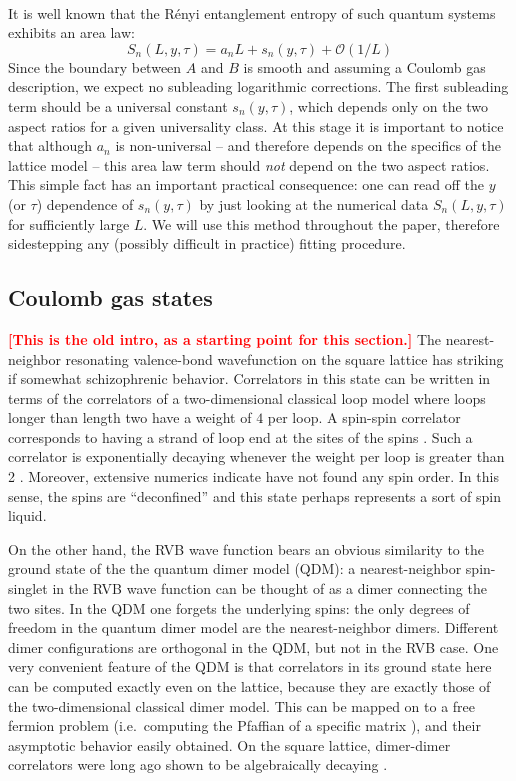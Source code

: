 \documentclass[11pt]{iopart}
\begin{document}
\paragraph{}
 It is well known that the R\'enyi entanglement entropy of such quantum systems exhibits an area law\cite{ALreview}:
 \begin{equation}
 S_n(L,y,\tau)= a_{n} L+s_{n}(y,\tau)+\mathcal{O}(1/L)
\end{equation}
Since the boundary between $A$ and $B$ is smooth and assuming a Coulomb gas description, we expect no subleading logarithmic corrections\cite{Hsu2009}. The first subleading term should be a universal constant $s_n(y,\tau)$, which depends only on the two aspect ratios for a given universality class. At this stage it is important to notice that although $a_n$ is non-universal -- and therefore depends on the specifics of the lattice model -- this area law term should \emph{not} depend on the two aspect ratios. This simple fact has an important practical consequence: one can read off the $y$ (or $\tau$) dependence of $s_n(y,\tau)$ by just looking at the numerical data $S_n(L,y,\tau)$ for sufficiently large $L$. We will use this method\cite{Ju2012} throughout the paper, therefore sidestepping any  (possibly difficult in practice) fitting procedure.    
\subsection{Coulomb gas states}
\label{sec:cg}
\textcolor{red}{\bf [This is the old intro, as a starting point for this section.]}
The nearest-neighbor resonating valence-bond wavefunction on the square lattice has striking if somewhat schizophrenic behavior. Correlators in this state can be written in terms of the correlators of a two-dimensional classical loop model where loops longer than length two have a weight of $4$ per loop. A spin-spin correlator corresponds to having a strand of loop end at the sites of the spins \cite{Doucot}. Such a correlator is exponentially decaying  whenever the weight per loop is greater than 2 \cite{Nienhuis}.  Moreover, extensive numerics indicate \cite{RVB1,RVB2} have not found any  spin order. In this sense, the spins are ``deconfined'' and this state perhaps represents a sort of spin liquid.

On the other hand, the RVB wave function bears an obvious similarity to the ground state of the
 the quantum dimer model (QDM)\cite{RokhsarKivelson}: a nearest-neighbor spin-singlet in the RVB wave function can be thought of as a dimer connecting the two sites. In the QDM one forgets the underlying spins: the only degrees of freedom in the quantum dimer model are the nearest-neighbor dimers. Different dimer configurations are orthogonal in the QDM, but  not in the RVB case. One very convenient feature of the QDM is that  correlators in its ground state here can be computed exactly even on the lattice, because they are exactly those of the two-dimensional classical dimer model. This can be mapped on to a free fermion problem (i.e.\ computing the Pfaffian of a specific matrix \cite{Kasteleyn,Fisher}), and their asymptotic behavior easily obtained. On the square lattice, dimer-dimer correlators were long ago shown to be algebraically decaying \cite{FisherStephenson}.
\end{document}
